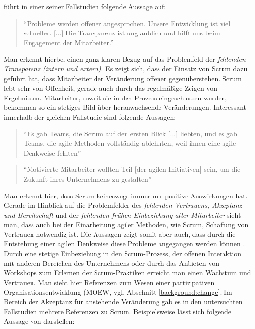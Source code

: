 

 führt in einer seiner Fallstudien folgende Aussage auf:

\begin{quote}
	``Probleme werden offener angesprochen. Unsere Entwicklung ist viel schneller. [...] Die Transparenz ist unglaublich und hilft uns beim Engagement der Mitarbeiter.'' \cite[S. 5]{fuchs_adapting_2019}
\end{quote}

Man erkennt hierbei einen ganz klaren Bezug auf das Problemfeld der \textit{fehlenden Transparenz (intern und extern)}. Es zeigt sich, dass der Einsatz von Scrum dazu geführt hat, dass Mitarbeiter der Veränderung offener gegenüberstehen. Scrum lebt sehr von Offenheit, gerade auch durch das regelmäßige Zeigen von Ergebnissen. Mitarbeiter, soweit sie in den Prozess eingeschlossen werden, bekommen so ein stetiges Bild über heranwachsende Veränderungen. Interessant innerhalb der gleichen Fallstudie sind folgende Aussagen:


\begin{quote}
	``Es gab Teams, die Scrum auf den ersten Blick [...] liebten, und es gab Teams, die agile Methoden vollständig ablehnten, weil ihnen eine agile Denkweise fehlten'' \cite[S. 5]{fuchs_adapting_2019}
\end{quote}

\begin{quote}
	 ``Motivierte Mitarbeiter wollten Teil [der agilen Initiativen] sein, um die Zukunft ihres Unternehmens zu gestalten'' \cite[S. 7]{fuchs_adapting_2019}
\end{quote}


Man erkennt hier, dass Scrum keineswegs immer nur positive Auswirkungen hat. Gerade im Hinblick auf die Problemfelder des \textit{fehlenden Vertrauens, Akzeptanz und Bereitschaft} und der \textit{fehlenden frühen Einbeziehung aller Mitarbeiter} sieht man, dass auch bei der  Einarbeitung agiler Methoden, wie Scrum, Schaffung von Vertrauen notwendig ist. Die Aussagen zeigt somit aber auch, dass durch die Entstehung einer agilen Denkweise diese Probleme angegangen werden können \cite{hofert_agile_2018}. Durch eine stetige Einbeziehung in den Scrum-Prozess, der offenen Interaktion mit anderen Bereichen des Unternehmens oder durch das Anbieten von Workshops zum Erlernen der Scrum-Praktiken erreicht man einen Wachstum und Vertrauen. Man sieht hier Referenzen zum Wesen einer partizipativen Organisationsentwicklung (MOEW, vgl. Abschnitt \ref{background:change}. Im Bereich der Akzeptanz für anstehende Veränderung gab es in den untersuchten Fallstudien mehrere Referenzen zu Scrum. Beispielsweise lässt sich folgende Aussage von  darstellen:

